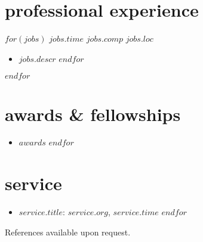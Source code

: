 \documentclass[]{friggeri-cv}
\begin{document}
\section{professional experience}
\begin{entrylist}
$for(jobs)$
  \entryalt
  {$jobs.time$}
  {$jobs.comp$}
  {$jobs.loc$}
  \setlength\parskip{0pt}
  \begin{itemize}[noitemsep, leftmargin=0.2in]
    $for(jobs.descr)$
      \item $jobs.descr$
    $endfor$
  \end{itemize}
  \setlength\parskip{12pt}
$endfor$
\end{entrylist}



\section{awards \& fellowships}
\begin{itemize}[noitemsep, leftmargin=0.6in]
$for(awards)$
  \item $awards$
$endfor$
\end{itemize}



\section{service}
\begin{itemize}[noitemsep, leftmargin=0.6in]
$for(service)$
  \item $service.title$: $service.org$, $service.time$ 
$endfor$
\end{itemize}






\vspace{0.2in}
References available upon request.
\end{document}
